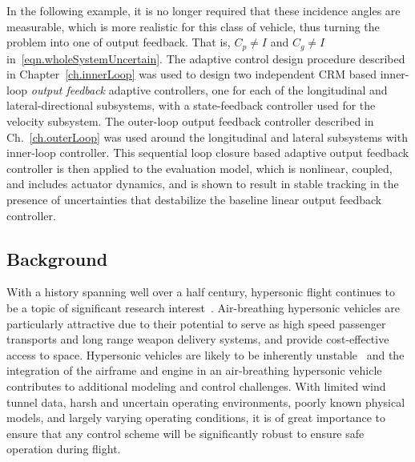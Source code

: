 In the following example, it is no longer required that these incidence angles are measurable, which is more realistic for this class of vehicle, thus turning the problem into one of output feedback.
That is, $C_{p}\neq I$ and $C_{g}\neq I$ in\ \eqref{eqn.wholeSystemUncertain}.
The adaptive control design procedure described in Chapter~\ref{ch.innerLoop} was used to design two independent CRM based inner-loop \textit{output feedback} adaptive controllers, one for each of the longitudinal and lateral-directional subsystems, with a state-feedback controller used for the velocity subsystem.
The outer-loop output feedback controller described in Ch.~\ref{ch.outerLoop} was used around the longitudinal and lateral subsystems with inner-loop controller.
This sequential loop closure based adaptive output feedback controller is then applied to the evaluation model, which is nonlinear, coupled, and includes actuator dynamics, and is shown to result in stable tracking in the presence of uncertainties that destabilize the baseline linear output feedback controller.

\subsection{Background}

With a history spanning well over a half century, hypersonic flight continues to be a topic of significant research interest\ \cite{brocanelli.unstartrecovery.2012, dalle.envelope.2011, gibson.adaptive.2009, kothari.reusable.2010, parker.control.2007}.
Air-breathing hypersonic vehicles are particularly attractive due to their potential to serve as high speed passenger transports and long range weapon delivery systems, and provide cost-effective access to space.
Hypersonic vehicles are likely to be inherently unstable\ \cite{bolender.hypersonicmodel.2007, mcruer.hypersonic.1991, mirmirani.airbreathing.2005} and the integration of the airframe and engine in an air-breathing hypersonic vehicle contributes to additional modeling and control challenges.
With limited wind tunnel data, harsh and uncertain operating environments, poorly known physical models, and largely varying operating conditions, it is of great importance to ensure that any control scheme will be significantly robust to ensure safe operation during flight.

